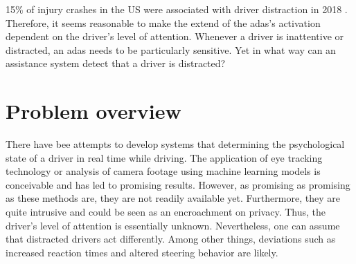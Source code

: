 

15\% of injury crashes in the US were associated with driver distraction in 2018 \parencite{distracted_nhtsa}. Therefore, it seems reasonable to make the extend of the \gls{adas}'s activation dependent on the driver's level of attention. Whenever a driver is inattentive or distracted, an \gls{adas} needs to be particularly sensitive. Yet in what way can an assistance system detect that a driver is distracted? 

\section{Problem overview}


There have bee attempts to develop systems that determining the psychological state of a driver in real time while driving. The application of eye tracking technology or analysis of camera footage using machine learning models is conceivable and has led to promising results. However, as promising as promising as these methods are, they are not readily available yet. Furthermore, they are quite intrusive and could be seen as an encroachment on privacy. Thus, the driver's level of attention is essentially unknown. Nevertheless, one can assume that distracted drivers act differently. Among other things, deviations such as increased reaction times and altered steering behavior are likely.


